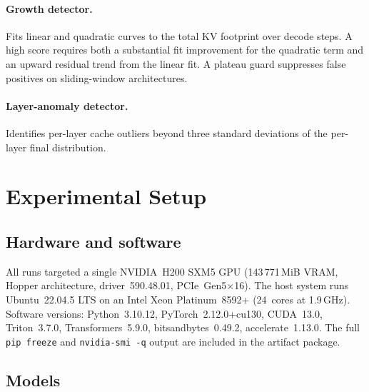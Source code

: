 \documentclass[11pt,a4paper]{article}
\newcommand{\code}[1]{\texttt{#1}}
\begin{document}
\paragraph{Growth detector.}
Fits linear and quadratic curves to the total KV footprint over
decode steps.
A high score requires both a substantial fit improvement for the
quadratic term and an upward residual trend from the linear fit.
A plateau guard suppresses false positives on sliding-window
architectures.

\paragraph{Layer-anomaly detector.}
Identifies per-layer cache outliers beyond three standard
deviations of the per-layer final distribution.

\section{Experimental Setup}
\label{sec:setup}

\subsection{Hardware and software}
\label{sec:setup:hw}

All runs targeted a single NVIDIA~H200 SXM5 GPU
(143\,771\,MiB VRAM, Hopper architecture, driver~590.48.01,
PCIe~Gen5$\times$16).
The host system runs Ubuntu~22.04.5 LTS on an Intel Xeon
Platinum~8592+ (24~cores at 1.9\,GHz).
Software versions: Python~3.10.12, PyTorch~2.12.0+cu130,
CUDA~13.0, Triton~3.7.0, Transformers~5.9.0,
bitsandbytes~0.49.2, accelerate~1.13.0.
The full \code{pip freeze} and \code{nvidia-smi -q} output are
included in the artifact package.

\subsection{Models}
\label{sec:setup:models}
\end{document}
